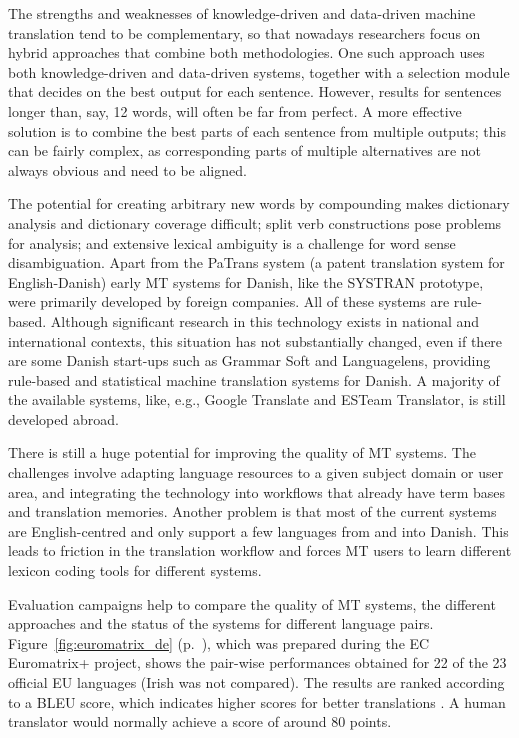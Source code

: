 \begin{multicols}{2}
The strengths and weaknesses of knowledge-driven and data-driven machine translation tend to be complementary, so that nowadays researchers focus on hybrid approaches that combine both methodologies. One such approach uses both knowledge-driven and data-driven systems, together with a selection module that decides on the best output for each sentence. However, results for sentences longer than, say, 12 words, will often be far from perfect. A more effective solution is to combine the best parts of each sentence from multiple outputs; this can be fairly complex, as corresponding parts of multiple alternatives are not always obvious and need to be aligned. 


The potential for creating arbitrary new words by compounding makes dictionary analysis and dictionary coverage difficult; split verb constructions pose problems for analysis; and extensive lexical ambiguity is a challenge for word sense disambiguation.
Apart from the PaTrans system (a patent translation system for English-Danish) early MT systems for Danish, like the SYSTRAN prototype, were primarily developed by foreign companies.
All of these systems are rule-based. Although significant research in this technology exists in national and international contexts, this situation has not substantially changed, even if there are some Danish start-ups such as Grammar Soft and Languagelens, providing rule-based and statistical machine translation systems for Danish. A majority of the available systems, like, e.g., Google Translate and ESTeam Translator, is still developed abroad.

There is still a huge potential for improving the quality of MT systems. The challenges involve adapting language resources to a given subject domain or user area, and integrating the technology into workflows that already have term bases and translation memories. Another problem is that most of the current systems are English-centred and only support a few languages from and into Danish. This leads to friction in the translation workflow and forces MT users to learn different lexicon coding tools for different systems.

Evaluation campaigns help to compare the quality of MT systems, the different approaches and the status of the systems for different language pairs. Figure~\ref{fig:euromatrix_de} (p.~\pageref{fig:euromatrix_de}), which was prepared during the EC Euromatrix+ project, shows the pair-wise performances obtained for 22 of the 23 official EU languages (Irish was not compared). The results are ranked according to a BLEU score, which indicates higher scores for better translations \cite{bleu1}. A human translator would normally achieve a score of around 80 points.


\end{multicols}
